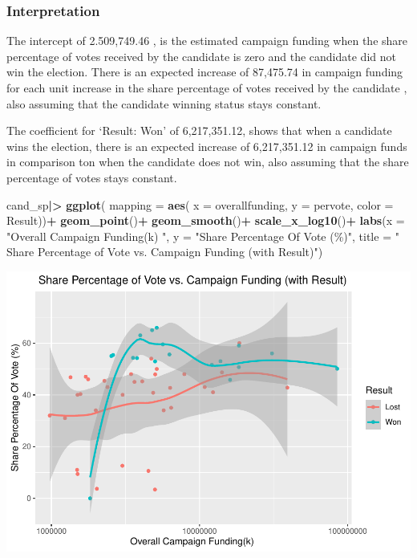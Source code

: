 \documentclass[
]{article}
\newenvironment{Shaded}{\begin{snugshade}}{\end{snugshade}}
\newcommand{\AttributeTok}[1]{\textcolor[rgb]{0.13,0.29,0.53}{#1}}
\newcommand{\FunctionTok}[1]{\textcolor[rgb]{0.13,0.29,0.53}{\textbf{#1}}}
\newcommand{\NormalTok}[1]{#1}
\newcommand{\SpecialCharTok}[1]{\textcolor[rgb]{0.81,0.36,0.00}{\textbf{#1}}}
\newcommand{\StringTok}[1]{\textcolor[rgb]{0.31,0.60,0.02}{#1}}
\begin{document}
\hypertarget{interpretation}{%
\subsubsection{\texorpdfstring{\textbf{Interpretation}}{Interpretation}}\label{interpretation}}

The intercept of 2.509,749.46 , is the estimated campaign funding when
the share percentage of votes received by the candidate is zero and the
candidate did not win the election. There is an expected increase of
87,475.74 in campaign funding for each unit increase in the share
percentage of votes received by the candidate , also assuming that the
candidate winning status stays constant.

The coefficient for `Result: Won' of 6,217,351.12, shows that when a
candidate wins the election, there is an expected increase of
6,217,351.12 in campaign funds in comparison ton when the candidate does
not win, also assuming that the share percentage of votes stays
constant.

\begin{Shaded}
\begin{Highlighting}[]
\NormalTok{cand\_sp}\SpecialCharTok{|\textgreater{}}
  \FunctionTok{ggplot}\NormalTok{(}
    \AttributeTok{mapping =} \FunctionTok{aes}\NormalTok{(}
      \AttributeTok{x =}\NormalTok{ overallfunding,}
      \AttributeTok{y =}\NormalTok{ pervote,}
      \AttributeTok{color =}\NormalTok{ Result))}\SpecialCharTok{+}
  \FunctionTok{geom\_point}\NormalTok{()}\SpecialCharTok{+}
  \FunctionTok{geom\_smooth}\NormalTok{()}\SpecialCharTok{+}
  \FunctionTok{scale\_x\_log10}\NormalTok{()}\SpecialCharTok{+}
   \FunctionTok{labs}\NormalTok{(}\AttributeTok{x =} \StringTok{"Overall Campaign Funding(k) "}\NormalTok{,}
       \AttributeTok{y =} \StringTok{"Share Percentage Of Vote (\%)"}\NormalTok{,}
       \AttributeTok{title =} \StringTok{" Share Percentage of Vote vs. Campaign Funding (with Result)"}\NormalTok{)}
\end{Highlighting}
\end{Shaded}

\includegraphics{index_files/figure-latex/unnamed-chunk-4-1.pdf}
\end{document}
